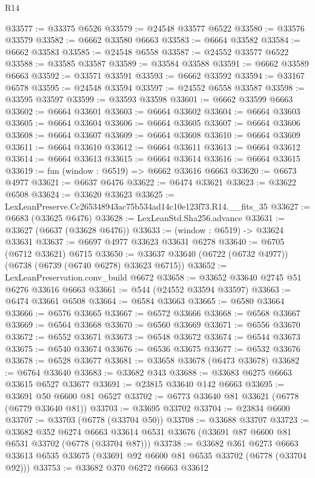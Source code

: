 \begin{lexlean}{R14}
\begin{coremodule}
@33577 := @33375 @6526
@33579 := @24548 @33577 @6522
@33580 := @33576 @33579
@33582 := @6662 @33580 @6663
@33583 := @6664 @33582
@33584 := @6662 @33583
@33585 := @24548 @6558
@33587 := @24552 @33577 @6522
@33588 := @33585 @33587
@33589 := @33584 @33588
@33591 := @6662 @33589 @6663
@33592 := @33571 @33591
@33593 := @6662 @33592
@33594 := @33167 @6578
@33595 := @24548 @33594
@33597 := @24552 @6558 @33587
@33598 := @33595 @33597
@33599 := @33593 @33598
@33601 := @6662 @33599 @6663
@33602 := @6664 @33601
@33603 := @6664 @33602
@33604 := @6664 @33603
@33605 := @6664 @33604
@33606 := @6664 @33605
@33607 := @6664 @33606
@33608 := @6664 @33607
@33609 := @6664 @33608
@33610 := @6664 @33609
@33611 := @6664 @33610
@33612 := @6664 @33611
@33613 := @6664 @33612
@33614 := @6664 @33613
@33615 := @6664 @33614
@33616 := @6664 @33615
@33619 := fun (window : @6519) => @6662 @33616 @6663
@33620 := @6673 @4977
@33621 := @6637 @6476
@33622 := @6474 @33621
@33623 := @33622 @6508
@33624 := @33620 @33623
@33625 := LexLeanPreserve.Cc265348943ac75b534ad14c10e123f73.R14.__fits_35
@33627 := @6683 (@33625 @6476)
@33628 := LexLeanStd.Sha256.advance
@33631 := @33627 (@6637 (@33628 @6476))
@33633 := (window : @6519) -> @33624 @33631
@33637 := @6697 @4977 @33623 @33631 @6278
@33640 := @6705 (@6712 @33621) @6715
@33650 := @33637 @33640 (@6722 (@6732 @4977)) (@6738 (@6739 (@6740 @6278) @33623 @6715))
@33652 := LexLeanPreservation.conv_build @6672
@33658 := @33652 @33640 @2745 @51 @6276 @33616 @6663
@33661 := @544 (@24552 @33594 @33597)
@33663 := @6474 @33661 @6508
@33664 := @6584 @33663
@33665 := @6580 @33664
@33666 := @6576 @33665
@33667 := @6572 @33666
@33668 := @6568 @33667
@33669 := @6564 @33668
@33670 := @6560 @33669
@33671 := @6556 @33670
@33672 := @6552 @33671
@33673 := @6548 @33672
@33674 := @6544 @33673
@33675 := @6540 @33674
@33676 := @6536 @33675
@33677 := @6532 @33676
@33678 := @6528 @33677
@33681 := @33658 @33678 (@6473 @33678)
@33682 := @6764 @33640
@33683 := @33682 @343
@33688 := @33683 @6275 @6663 @33615 @6527 @33677
@33691 := @23815 @33640 @142 @6663
@33695 := @33691 @50 @6600 @81 @6527
@33702 := @6773 @33640 @81 @33621 (@6778 (@6779 @33640 @81))
@33703 := @33695 @33702
@33704 := @23834 @6600
@33707 := @33703 (@6778 (@33704 @50))
@33708 := @33688 @33707
@33723 := @33682
    @352
    @6274
    @6663
    @33614
    @6531
    @33676
    (@33691 @87 @6600 @81 @6531 @33702 (@6778 (@33704 @87)))
@33738 := @33682
    @361
    @6273
    @6663
    @33613
    @6535
    @33675
    (@33691 @92 @6600 @81 @6535 @33702 (@6778 (@33704 @92)))
@33753 := @33682
    @370
    @6272
    @6663
    @33612

\end{coremodule}
\end{lexlean}
